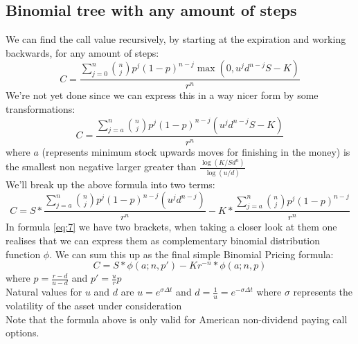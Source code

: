 \documentclass{article}
\begin{document}
\subsection{Binomial tree with any amount of steps}
We can find the call value recursively, by starting at the expiration and working backwards, for any amount of steps:
\begin{equation}\label{eq:5}
    C = \frac{\sum_{j=0}^{n}{n \choose j} p^{j}(1-p)^{n-j}\max(0, u^{j}d^{n-j}S - K)}{r^{n}}
\end{equation}
We’re not yet done since we can express this in a way nicer form by some transformations:
\begin{equation}\label{eq:6}
    C = \frac{\sum_{j=a}^{n} {n \choose j} p^{j}(1-p)^{n-j} (u^{j}d^{n-j}S - K)}{r^{n}}
\end{equation}
where $a$ (represents minimum stock upwards moves for finishing in the money) is the smallest non negative larger greater than $\frac{\log(K / S d^{n})}{\log(u / d)} $ \\
We'll break up the above formula into two terms:
\begin{equation}\label{eq:7}
    C = S *\frac{\sum_{j=a}^{n} {n \choose j} p^{j}(1-p)^{n-j} (u^{j}d^{n-j})}{r^{n}} - K * \frac{\sum_{j=a}^{n} {n \choose j} p^{j}(1-p)^{n-j}}{r^{n}}
\end{equation}
In formula \ref{eq:7} we have two brackets, when taking a closer look at them one realises that we can express them as complementary binomial distribution function $\phi$. We can sum this up as the final simple Binomial Pricing formula:
\begin{equation}\label{eq:8}
    C = S *\phi(a; n, p') - K r^{-n} * \phi(a; n, p)
\end{equation}
where $p=\frac{r-d}{u-d}$ and $p'=\frac{u}{r}p$\\ [2ex]
Natural values for $u$ and $d$ are $u = e^{\sigma \Delta t}$ and $d=\frac{1}{u}=e^{-\sigma \Delta t}$ where $\sigma$ represents the volatility of the asset under consideration \\ [2ex]
Note that the formula above is only valid for American non-dividend paying call options.
\end{document}
